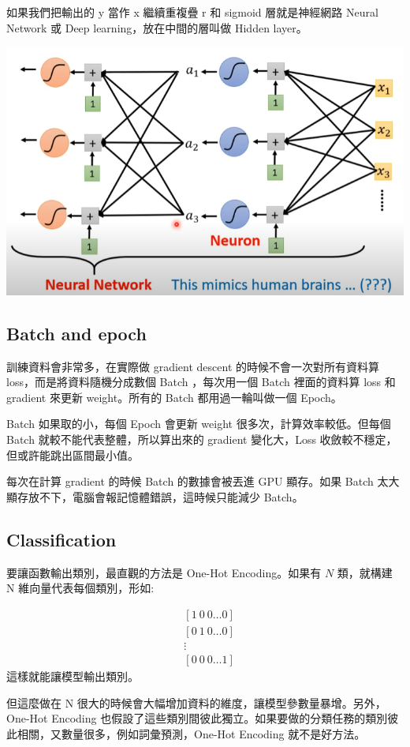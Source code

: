 如果我們把輸出的 y 當作 x 繼續重複疊 r 和 sigmoid 層就是神經網路 Neural Network 或 Deep learning，放在中間的層叫做 Hidden layer。

\includegraphics[width=.8\textwidth]{paste_src/2025-03-20-14-24-18.png}

\subsection*{Batch and epoch}

訓練資料會非常多，在實際做 gradient descent 的時候不會一次對所有資料算 loss，而是將資料隨機分成數個 Batch ，每次用一個 Batch 裡面的資料算 loss 和 gradient 來更新 weight。所有的 Batch 都用過一輪叫做一個 Epoch。

Batch 如果取的小，每個 Epoch 會更新 weight 很多次，計算效率較低。但每個 Batch 就較不能代表整體，所以算出來的 gradient 變化大，Loss 收斂較不穩定，但或許能跳出區間最小值。

每次在計算 gradient 的時候 Batch 的數據會被丟進 GPU 顯存。如果 Batch 太大顯存放不下，電腦會報記憶體錯誤，這時候只能減少 Batch。

\subsection{Classification} 

要讓函數輸出類別，最直觀的方法是 One-Hot Encoding。如果有 $N$ 類，就構建 N 維向量代表每個類別，形如: 

\begin{align*}
  &[ 1\ 0\ 0 \dots 0]\\
  &[ 0\ 1\ 0 \dots 0]\\
  &\vdots \\
  &[ 0\ 0\ 0 \dots 1]
\end{align*}
這樣就能讓模型輸出類別。


但這麼做在 N 很大的時候會大幅增加資料的維度，讓模型參數量暴增。另外， One-Hot Encoding 也假設了這些類別間彼此獨立。如果要做的分類任務的類別彼此相關，又數量很多，例如詞彙預測，One-Hot Encoding 就不是好方法。







